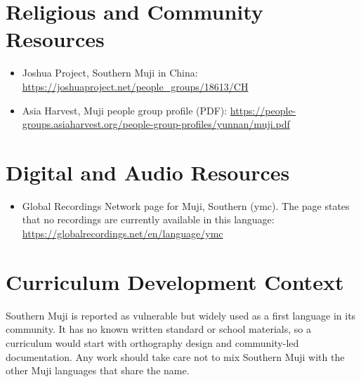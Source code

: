 \documentclass[12pt]{article}
\begin{document}
\section{Religious and Community Resources}
\begin{itemize}
\item Joshua Project, Southern Muji in China: \url{https://joshuaproject.net/people_groups/18613/CH}
\item Asia Harvest, Muji people group profile (PDF): \url{https://people-groups.asiaharvest.org/people-group-profiles/yunnan/muji.pdf}
\end{itemize}

\section{Digital and Audio Resources}
\begin{itemize}
\item Global Recordings Network page for Muji, Southern (ymc). The page states that no recordings are currently available in this language: \url{https://globalrecordings.net/en/language/ymc}
\end{itemize}

\section{Curriculum Development Context}
Southern Muji is reported as vulnerable but widely used as a first language in its community. It has no known written standard or school materials, so a curriculum would start with orthography design and community-led documentation. Any work should take care not to mix Southern Muji with the other Muji languages that share the name.
\end{document}
